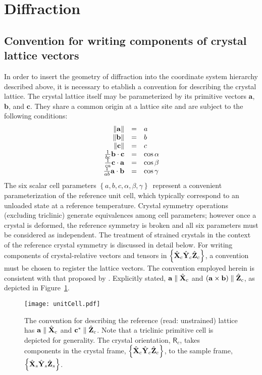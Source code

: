 \documentclass[12pt,letterpaper,final]{amsart}
\newcommand{\mbm}[1]{\ensuremath{\mbox{\boldmath$#1$}}}
\newcommand{\rmatc}{\ensuremath{\mathsf{R}_c}}
\newcommand{\Xs}{\ensuremath{\hat{\mbm{\mathrm{X}}}_s}}
\newcommand{\Ys}{\ensuremath{\hat{\mbm{\mathrm{Y}}}_s}}
\newcommand{\Zs}{\ensuremath{\hat{\mbm{\mathrm{Z}}}_s}}
\newcommand{\sampframe}{\ensuremath{\left\{\Xs\Ys\Zs\right\}}}
\newcommand{\Xc}{\ensuremath{\hat{\mbm{\mathrm{X}}}_c}}
\newcommand{\Yc}{\ensuremath{\hat{\mbm{\mathrm{Y}}}_c}}
\newcommand{\Zc}{\ensuremath{\hat{\mbm{\mathrm{Z}}}_c}}
\newcommand{\crysframe}{\ensuremath{\left\{\Xc\Yc\Zc\right\}}}
\newcommand{\figref}[1]{Figure~\ref{#1}}
\newcommand{\cella}{\ensuremath{\mathbf{a}}}
\newcommand{\cellb}{\ensuremath{\mathbf{b}}}
\newcommand{\cellc}{\ensuremath{\mathbf{c}}}
\newcommand{\dalfa}{\ensuremath{\alpha}}
\newcommand{\dbeta}{\ensuremath{\beta}}
\newcommand{\dgama}{\ensuremath{\gamma}}
\newcommand{\cellParams}{\ensuremath{\left\{ a,b,c,\dalfa,\dbeta,\dgama \right\}}}
\newcommand{\rcellc}{\ensuremath{\mathbf{c}^*}}
\newcommand{\dotp}[2]{\ensuremath{#1\cdot#2}}
\newcommand{\crossp}[2]{\ensuremath{#1\times#2}}
\begin{document}
\newpage
\section{Diffraction}\label{S:diffraction}
\subsection{Convention for writing components of crystal lattice vectors}\label{S:conventions}
In order to insert the geometry of diffraction into the coordinate
system hierarchy described above, it is necessary to etablish a
convention for describing the crystal lattice. The crystal lattice
itself may be parameterized by its primitive vectors \cella, \cellb,
and \cellc.  They share a common origin at a lattice site and are
subject to the following conditions:
\begin{equation}
  \begin{array}{rcl}
    \|\cella\| &=& a\\
    \|\cellb\| &=& b\\
    \|\cellc\| &=& c\\
    {1 \over bc}\dotp{\cellb}{\cellc} &=& \cos\dalfa\\
    {1 \over ca}\dotp{\cellc}{\cella} &=& \cos\dbeta\\
    {1 \over ab}\dotp{\cella}{\cellb} &=& \cos\dgama
  \end{array} \label{E:lattParams}
\end{equation}
The six scalar cell parameters \cellParams\ represent a convenient
parameterization of the reference unit cell, which typically
correspond to an unloaded state at a reference temperature. Crystal
symmetry operations (excluding triclinic) generate equivalences among
cell parameters; however once a crystal is deformed, the reference
symmetry is broken and all six parameters must be considered as
independent.  The treatment of strained crystals in the context of the
reference crystal symmetry is discussed in detail below.  For writing
components of crystal-relative vectors and tensors in \crysframe, a
convention must be chosen to register the lattice vectors.  The
convention employed herein is consistent with that proposed by
\cite{Nye:crysBookAppB}.  Explicitly stated, $\cella\parallel\Xc$ and
$(\crossp{\cella}{\cellb})\parallel\Zc$, as depicted in
\figref{F:lattice}.
\begin{figure}[ht]
  \centering
  \texttt{[image: unitCell.pdf]}
  \caption{The convention for describing the
    reference (read: unstrained) lattice has $\cella\parallel\Xc$ and
    $\rcellc\parallel\Zc$. Note that a triclinic
    primitive cell is depicted for generality.  The crystal orientation, \rmatc,
    takes components in the crystal frame, \crysframe, to the sample
    frame, \sampframe.}
  \label{F:lattice}
\end{figure}
\end{document}
